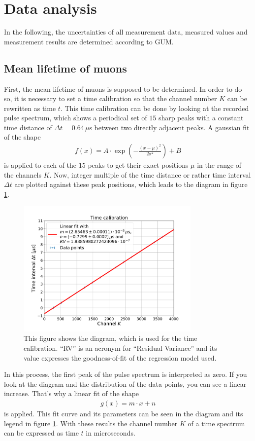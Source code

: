 \section{Data analysis}

In the following, the uncertainties of all measurement data, measured values and measurement results are determined according to GUM\cite{gum}.

\subsection{Mean lifetime of muons}

First, the mean lifetime of muons is supposed to be determined.
In order to do so, it is necessary to set a time calibration so that the channel number $K$ can be rewritten as time $t$.
This time calibration can be done by looking at the recorded pulse spectrum, which shows a periodical set of $15$ sharp peaks with a constant time distance of $\Delta t=0.64\,\mu$s between two directly adjacent peaks.
A gaussian fit of the shape
\begin{align} \label{Gaussian}
f(x)=A\cdot\exp\left( -\frac{(x-\mu)^2}{2\sigma ^2}\right) + B
\end{align}
\noindent is applied to each of the $15$ peaks to get their exact positions $\mu$ in the range of the channels $K$.
Now, integer multiple of the time distance or rather time interval $\Delta t$ are plotted against these peak positions, which leads to the diagram in figure \ref{TimeCalibration}.
\begin{figure}[H]
	\centering
	\includegraphics[width=0.8\textwidth]{src/TimeCalibration}
	\caption{This figure shows the diagram, which is used for the time calibration. \enquote{RV} is an acronym for \enquote{Residual Variance} and its value expresses the goodness-of-fit of the regression model used.}
	\label{TimeCalibration}
\end{figure}
\noindent In this process, the first peak of the pulse spectrum is interpreted as zero.
If you look at the diagram and the distribution of the data points, you can see a linear increase.
That's why a linear fit of the shape 
\begin{align} \label{line}
g(x)=m\cdot x + n
\end{align}
\noindent is applied.
This fit curve and its parameters can be seen in the diagram and its legend in figure \ref{TimeCalibration}.
With these results the channel number $K$ of a time spectrum can be expressed as time $t$ in microseconds.

